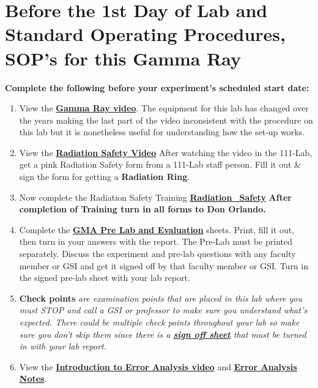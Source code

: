 \documentclass{../lab}
\begin{document}
\section{Before the 1st Day of Lab and Standard Operating Procedures, SOP's for this Gamma Ray}

\noindent\textbf{Complete the following before your experiment's scheduled start date:}

\begin{enumerate}
    \item View the \href{http://youtu.be/cZGMngx-6yE}{\textbf{Gamma Ray video}}. The equipment for this lab has changed over the years making the last part of the video inconsistent with the procedure on this lab but it is nonetheless useful for understanding how the set-up works.

    \item View the \href{http://youtu.be/KHxtzF5pZZM}{\textbf{\textbf{Radiation Safety Video}}} After watching the video in the 111-Lab, get a pink Radiation Safety form from a 111-Lab staff person. Fill it out \& sign the form for getting a \textbf{Radiation Ring}.

    \item Now complete the Radiation Safety Training \href{http://experimentationlab.berkeley.edu/RadiationSafety}{\textbf{Radiation\_Safety}} \textbf{After completion of Training turn in all forms to Don Orlando.}

    \item Complete the \href{http://experimentationlab.berkeley.edu/GMAPreLab}{\textbf{GMA Pre Lab and Evaluation}} sheets. Print, fill it out, then turn  in your answers with the report. The Pre-Lab must be printed separately. Discuss the experiment and pre-lab questions with any faculty member or GSI and get it signed off by that faculty member or GSI. Turn in the signed pre-lab sheet with your lab report.

    \item \textbf{Check points} \emph{are examination points that are placed in this lab where you must STOP and call a GSI or professor to make sure you understand what's expected. There could  be multiple check points throughout your lab so make sure you don't skip them since there is a \href{http://experimentationlab.berkeley.edugmacheckpoints}{\textbf{sign off sheet}} that must be turned in with your lab report.}

    \item View the \href{http://youtu.be/jR54387Wd6c}{\textbf{Introduction to Error Analysis video}} and \href{http://experimentationlab.berkeley.edu/EAX}{\textbf{\textbf{Error Analysis Notes}}}.


\end{enumerate}
\end{document}

